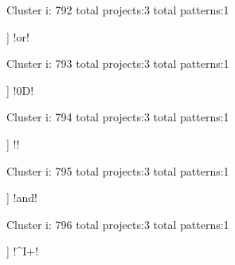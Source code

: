 Cluster i: 792
total projects:3
total patterns:1
\begin{multicols}{1}
\begin{description}[noitemsep,topsep=0pt]
\item [[3] ] \cverb!or!
\end{description}
\end{multicols}







Cluster i: 793
total projects:3
total patterns:1
\begin{multicols}{1}
\begin{description}[noitemsep,topsep=0pt]
\item [[3] ] \cverb!0D!
\end{description}
\end{multicols}







Cluster i: 794
total projects:3
total patterns:1
\begin{multicols}{1}
\begin{description}[noitemsep,topsep=0pt]
\item [[3] ] \cverb!\+!
\end{description}
\end{multicols}







Cluster i: 795
total projects:3
total patterns:1
\begin{multicols}{1}
\begin{description}[noitemsep,topsep=0pt]
\item [[3] ] \cverb!and!
\end{description}
\end{multicols}







Cluster i: 796
total projects:3
total patterns:1
\begin{multicols}{1}
\begin{description}[noitemsep,topsep=0pt]
\item [[3] ] \cverb!^I+!
\end{description}
\end{multicols}







